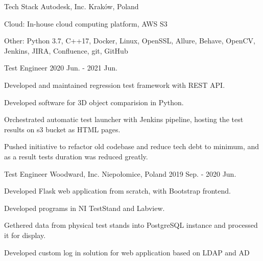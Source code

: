 \begin{cventries}
  \cventrytwopositions
    {Tech Stack} %
    {Autodesk, Inc.} %
    {Kraków, Poland} %
    {}
    {
      \begin{cvitems}
        \item {Cloud: In-house cloud computing platform, AWS S3}
        \item {Other: Python 3.7, C++17, Docker, Linux, OpenSSL, Allure, Behave, OpenCV, Jenkins, JIRA, Confluence, git, GitHub}
      \end{cvitems}
    }
    {Test Engineer} %
    {2020 Jun. - 2021 Jun.} %
    {
      \begin{cvitems} %
        \item {Developed and maintained regression test framework with REST API.}
        \item {Developed software for 3D object comparision in Python.}
        \item {Orchestrated automatic test launcher with Jenkins pipeline, hosting the test results on s3 bucket as HTML pages.}
        \item {Pushed initiative to refactor old codebase and reduce tech debt to minimum, and as a result tests duration was reduced greatly.}
      \end{cvitems}
    }

  \cventry
    {Test Engineer} %
    {Woodward, Inc.} %
    {Niepołomice, Poland} %
    {2019 Sep. - 2020 Jun.} %
    {
      \begin{cvitems} %
        \item {Developed Flask web application from scratch, with Bootstrap frontend.}
        \item {Developed programs in NI TestStand and Labview.}
        \item {Gethered data from physical test stands into PostgreSQL instance and processed it for display.}
        \item {Developed custom log in solution for web application based on LDAP and AD}
      \end{cvitems}
    }


\end{cventries}
